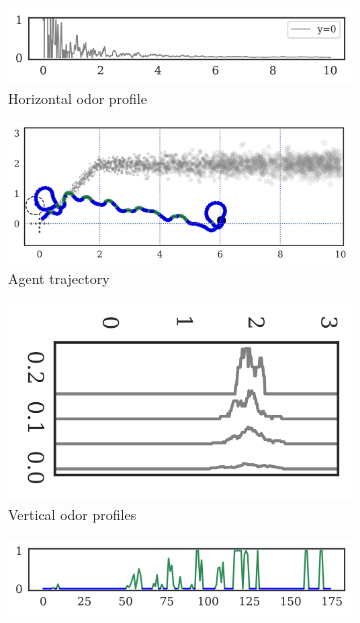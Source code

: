 \documentclass[5p,twocolumn,authoryear]{elsarticle}
\begin{document}
\begin{figure}[h!]
\begin{subfigure}{0.40\textwidth}
    \includegraphics[width=\textwidth]{output_16_4.png}
    \caption{Horizontal odor profile}
\end{subfigure}%
\caption{Constant wind direction}
\begin{subfigure}{0.40\textwidth}
    \includegraphics[width=\textwidth]{output_16_8.png}
    \caption{Agent trajectory}
\end{subfigure}%
\begin{subfigure}{0.18\textwidth}
    \includegraphics[width=\textwidth,angle=90,origin=c]{output_16_10.png}
    \caption{Vertical odor profiles}
\end{subfigure}%
\begin{subfigure}{0.40\textwidth}
    \includegraphics[width=\textwidth]{output_16_13.png} 

\end{subfigure}
\end{figure}
\end{document}
